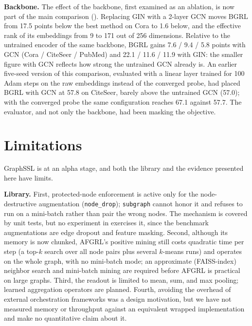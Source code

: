 \documentclass[conference]{IEEEtran}
\begin{document}
\textbf{Backbone.} The effect of the backbone, first examined as an ablation, is now part of the main comparison (). Replacing GIN with a 2-layer GCN moves BGRL from 17.5 points below the best method on Cora to 1.6 below, and the effective rank of its embeddings from 9 to 171 out of 256 dimensions. Relative to the untrained encoder of the same backbone, BGRL gains 7.6 / 9.4 / 5.8 points with GCN (Cora / CiteSeer / PubMed) and 22.1 / 11.6 / 11.9 with GIN: the smaller figure with GCN reflects how strong the untrained GCN already is. An earlier five-seed version of this comparison, evaluated with a linear layer trained for 100 Adam steps on the raw embeddings instead of the converged probe, had placed BGRL with GCN at 57.8 on CiteSeer, barely above the untrained GCN (57.0); with the converged probe the same configuration reaches 67.1 against 57.7. The evaluator, and not only the backbone, had been masking the objective.

\section{Limitations}
\label{sec:limitations}
GraphSSL is at an alpha stage, and both the library and the evidence presented here have limits.

\textbf{Library.} First, protected-node enforcement is active only for the node-destructive augmentation (\texttt{node\_drop}); \texttt{subgraph} cannot honor it and refuses to run on a mini-batch rather than pair the wrong nodes. The mechanism is covered by unit tests, but no experiment in  exercises it, since the benchmark augmentations are edge dropout and feature masking. Second, although its memory is now chunked, AFGRL's positive mining still costs quadratic time per step (a top-$k$ search over all node pairs plus several $k$-means runs) and operates on the whole graph, with no mini-batch mode; an approximate (FAISS-index) neighbor search and mini-batch mining are required before AFGRL is practical on large graphs. Third, the readout is limited to mean, sum, and max pooling; learned aggregation operators are planned. Fourth, avoiding the overhead of external orchestration frameworks was a design motivation, but we have not measured memory or throughput against an equivalent wrapped implementation and make no quantitative claim about it.
\end{document}
